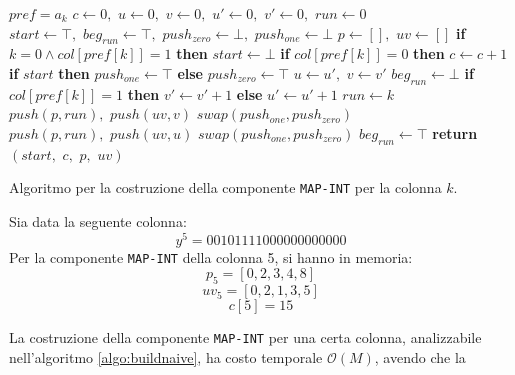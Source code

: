 \begin{algorithm}
  \small
  \begin{algorithmic}[1]
    \Comment $pref=a_k$
    \State $c\gets 0,\,\,u\gets 0,\,\,v\gets 0,\,\,u'\gets 0,\,\, v'\gets
    0,\,\,run\gets 0$
    \State $start \gets \top,\,\,beg_{run}\gets \top,\,\,push_{zero}\gets
    \bot,\,\,push_{one}\gets \bot$
    \State $p\gets [],\,\,uv\gets []$
    \For {\textit{every} $k\in\left[0,\,\, M\right)$}
    \State \textbf{if} $k=0\land col[pref[k]]=1$ \textbf{then} $start \gets \bot$ 
    \State \textbf{if} $col[pref[k]]=0$ \textbf{then} $c\gets c+1$
    \EndFor
    \State \textbf{if} $start$ \textbf{then} $push_{one}\gets \top$
    \textbf{else} $push_{zero}\gets \top$
    \For{\textit{every} $k\in[0,M)$}
    \State $u\gets u',\,\,v\gets v'$
    \State $beg_{run}\gets \bot$
    \EndIf
    \State \textbf{if} $col[pref[k]]=1$ \textbf{then}  $v'\gets v'+1$
    \textbf{else} $u'\gets u'+1$
    \State $run\gets k$
    \EndIf
    \State $push(p, run),\,\,push(uv, v)$
    \State $swap(push_{one}, push_{zero})$
    \Else
    \State $push(p, run),\,\,push(uv, u)$
    \State $swap(push_{one}, push_{zero})$
    \EndIf
    \State $beg_{run}\gets \top$
    \EndIf
    \EndFor
    \State \textbf{return} $(start,\,\, c,\,\, p,\,\, uv)$
    \EndFunction
  \end{algorithmic}
  \caption{\footnotesize{Algoritmo per la costruzione della componente
  \texttt{MAP-INT} per la colonna $k$.}}
  \label{algo:buildnaive}
\end{algorithm}
\begin{esempio}
  Sia data la seguente colonna:
  \[y^5=00101111000000000000\]
  Per la componente \texttt{MAP-INT} della colonna 5, si hanno in memoria:
  \[p_5=[0,2,3,4,8]\]
  \[uv_5=[0,2,1,3,5]\]
  \[c[5]=15\]
\end{esempio}
La costruzione della componente \texttt{MAP-INT} per una certa colonna,
analizzabile nell'algoritmo 
\ref{algo:buildnaive}, ha costo temporale $\mathcal{O}(M)$, avendo che la

